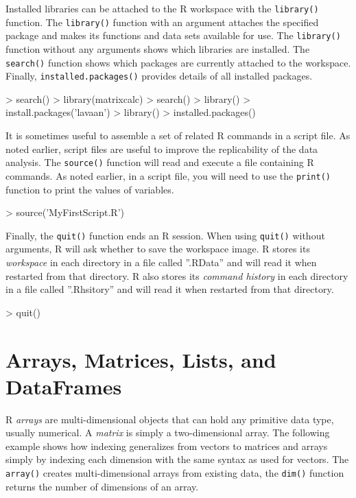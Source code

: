Installed libraries can be attached to the R workspace with the \texttt{library()} function. The \texttt{library()} function with an argument attaches the specified package and makes its functions and data sets available for use. The \texttt{library()} function without any arguments shows which libraries are installed. The \texttt{search()} function shows which packages are currently attached to the workspace. Finally, \texttt{installed.packages()} provides details of all installed packages. 

\begin{samepage}
\begin{Rcode}
> search()
> library(matrixcalc)
> search()
> library()
> install.packages('lavaan')
> library()
> installed.packages()
\end{Rcode}
\end{samepage}

It is sometimes useful to assemble a set of related R commands in a script file. As noted earlier, script files are useful to improve the replicability of the data analysis. The \texttt{source()} function will read and execute a file containing R commands. As noted earlier, in a script file, you will need to use the \texttt{print()} function to print the values of variables.

\begin{Rcode}
> source('MyFirstScript.R')
\end{Rcode}

Finally, the \texttt{quit()} function ends an R session. When using \texttt{quit()} without arguments, R will ask whether to save the workspace image. R stores its \emph{workspace} in each directory in a file called ''.RData'' and will read it when restarted from that directory. R also stores its \emph{command history} in each directory in a file called ''.Rhsitory'' and will read it when restarted from that directory.

\begin{Rcode}
> quit()
\end{Rcode}

\section{Arrays, Matrices, Lists, and DataFrames}

R \emph{arrays} are multi-dimensional objects that can hold any primitive data type, usually numerical. A \emph{matrix} is simply a two-dimensional array. The following example shows how indexing generalizes from vectors to matrices and arrays simply by indexing each dimension with the same syntax as used for vectors. The \texttt{array()} creates multi-dimensional arrays from existing data, the \texttt{dim()} function returns the number of dimensions of an array.

